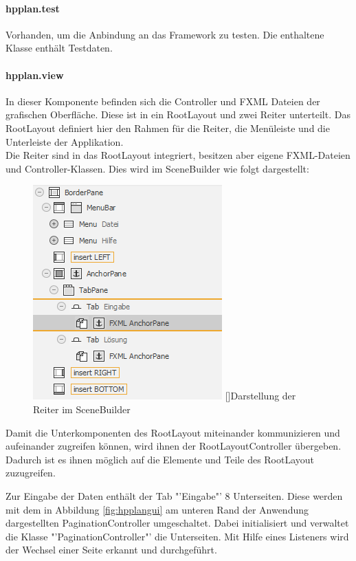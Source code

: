 \documentclass[12pt,a4paper, listof=entryprefix, bibliography=totocnumbered,toc=listofnumbered,lof=listofnumbered]{scrartcl}
\begin{document}
\paragraph{hpplan.test}
Vorhanden, um die Anbindung an das Framework zu testen. Die enthaltene Klasse enthält Testdaten.

\paragraph{hpplan.view}
\label{par:hpplanView}
In dieser Komponente befinden sich die Controller und FXML Dateien der grafischen Oberfläche. Diese ist in ein RootLayout und zwei Reiter unterteilt. Das RootLayout definiert hier den Rahmen für die Reiter, die Menüleiste und die Unterleiste der Applikation.
\\
Die Reiter sind in das RootLayout integriert, besitzen aber eigene FXML-Dateien und Controller-Klassen. Dies wird im SceneBuilder wie folgt dargestellt:

\begin{figure}[H]
	\centering
	\includegraphics[]{images/fxTabs.png} 
	[]{Darstellung der Reiter im SceneBuilder}
	\label{fig:fxTabs}
\end{figure}

Damit die Unterkomponenten des RootLayout miteinander kommunizieren und aufeinander zugreifen können, wird ihnen der RootLayoutController übergeben. Dadurch ist es ihnen möglich auf die Elemente und Teile des RootLayout zuzugreifen.

Zur Eingabe der Daten enthält der Tab "'Eingabe"' 8 Unterseiten. Diese werden mit dem in Abbildung \ref{fig:hpplangui} am unteren Rand der Anwendung dargestellten PaginationController umgeschaltet. Dabei initialisiert und verwaltet die Klasse "'PaginationController"' die Unterseiten. Mit Hilfe eines Listeners wird der Wechsel einer Seite erkannt und durchgeführt.
\end{document}
